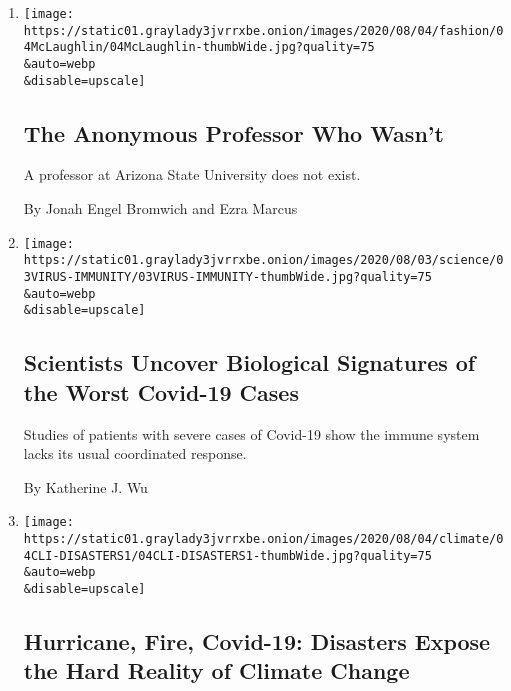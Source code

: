 \begin{enumerate}
\def\labelenumi{\arabic{enumi}.}
\item
  \href{/2020/08/04/style/college-coronavirus-hoax.html}{}

  \texttt{[image: https://static01.graylady3jvrrxbe.onion/images/2020/08/04/fashion/04McLaughlin/04McLaughlin-thumbWide.jpg?quality=75\\\&auto=webp\\\&disable=upscale]}

  \hypertarget{the-anonymous-professor-who-wasnt}{%
  \subsection{The Anonymous Professor Who
  Wasn't}\label{the-anonymous-professor-who-wasnt}}

  A professor at Arizona State University does not exist.

  By Jonah Engel Bromwich and Ezra Marcus
\item
  \href{/2020/08/04/health/coronavirus-immune-system.html}{}

  \texttt{[image: https://static01.graylady3jvrrxbe.onion/images/2020/08/03/science/03VIRUS-IMMUNITY/03VIRUS-IMMUNITY-thumbWide.jpg?quality=75\\\&auto=webp\\\&disable=upscale]}

  \hypertarget{scientists-uncover-biological-signatures-of-the-worst-covid-19-cases}{%
  \subsection{Scientists Uncover Biological Signatures of the Worst
  Covid-19
  Cases}\label{scientists-uncover-biological-signatures-of-the-worst-covid-19-cases}}

  Studies of patients with severe cases of Covid-19 show the immune
  system lacks its usual coordinated response.

  By Katherine J. Wu
\item
  \href{/2020/08/04/climate/hurricane-isaias-apple-fire-climate.html}{}

  \texttt{[image: https://static01.graylady3jvrrxbe.onion/images/2020/08/04/climate/04CLI-DISASTERS1/04CLI-DISASTERS1-thumbWide.jpg?quality=75\\\&auto=webp\\\&disable=upscale]}

  \hypertarget{hurricane-fire-covid-19-disasters-expose-the-hard-reality-of-climate-change}{%
  \subsection{Hurricane, Fire, Covid-19: Disasters Expose the Hard
  Reality of Climate
  Change}\label{hurricane-fire-covid-19-disasters-expose-the-hard-reality-of-climate-change}}


\end{enumerate}
